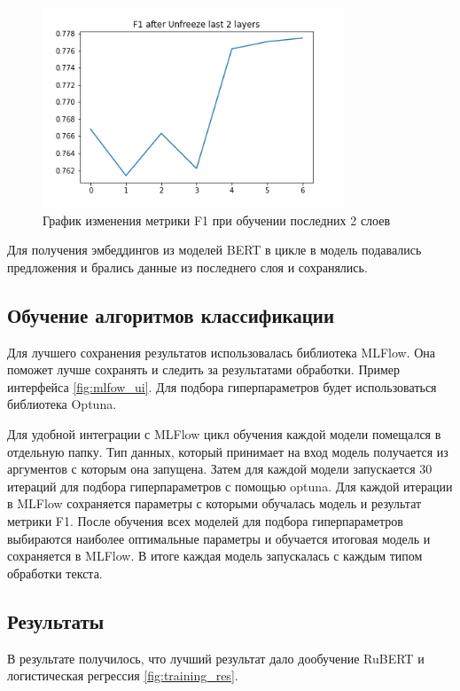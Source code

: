 \documentclass[PI, VKR]{HSEUniversity}
\begin{document}
\begin{figure}[h]
\centering
\includegraphics[width=0.8\textwidth]{img/DeepPavlovrubert-base-cased F1 Unfreeze last 2 layers.png}
\caption{\label{fig:bert_unfreeze_two_last}График изменения метрики F1 при обучении последних 2 слоев}
\end{figure}

Для получения эмбеддингов из моделей BERT в цикле в модель подавались предложения и брались данные из последнего слоя и сохранялись.
\subsection{Обучение алгоритмов классификации}
\label{sec:orgfad96b8}
Для лучшего сохранения результатов использовалась библиотека MLFlow\autocite{chen_developments_2020}. Она поможет лучше сохранять и следить за результатами обработки. Пример интерфейса \ref{fig:mlfow_ui}. Для подбора гиперпараметров будет использоваться библиотека Optuna\autocite{akiba_optuna_2019}.

Для удобной интеграции с MLFlow цикл обучения каждой модели помещался в отдельную папку. Тип данных, который принимает на вход модель получается из аргументов с которым она запущена. Затем для каждой модели запускается 30 итераций для подбора гиперпараметров с помощью optuna. Для каждой итерации в MLFlow сохраняется параметры с которыми обучалась модель и результат метрики F1. После обучения всех моделей для подбора гиперпараметров выбираются наиболее оптимальные параметры и обучается итоговая модель и сохраняется в MLFlow. В итоге каждая модель запускалась с каждым типом обработки текста.
\subsection{Результаты}
\label{sec:orgd05038a}
В результате получилось, что лучший результат дало дообучение RuBERT и логистическая регрессия \ref{fig:training_res}.
\end{document}
